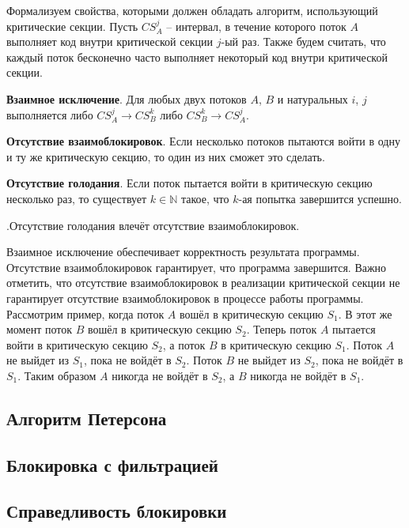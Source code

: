 Формализуем свойства, которыми должен обладать алгоритм, использующий
критические секции. Пусть $CS^j_A$ -- интервал, в течение которого поток $A$
выполняет код внутри критической секции $j$-ый раз. Также будем считать, что
каждый поток бесконечно часто выполняет некоторый код внутри критической секции.

\textbf{Взаимное исключение}. Для любых двух потоков $A$, $B$ и натуральных $i$,
$j$ выполняется либо $CS^j_A \rightarrow CS^k_B$ либо
$CS^k_B \rightarrow CS^j_A$.

\textbf{Отсутствие взаимоблокировок}. Если несколько потоков пытаются войти в
одну и ту же критическую секцию, то один из них сможет это сделать.

\textbf{Отсутствие голодания}. Если поток пытается войти в критическую секцию
несколько раз, то существует $k \in \mathbb{N}$ такое, что $k$-ая попытка
завершится успешно.

\begin{note}.Отсутствие голодания влечёт отсутствие взаимоблокировок.
\end{note}

Взаимное исключение обеспечивает корректность результата программы. Отсутствие
взаимоблокировок гарантирует, что программа завершится. Важно отметить, что
отсутствие взаимоблокировок в реализации критической секции не гарантирует
отсутствие взаимоблокировок в процессе работы программы. Рассмотрим пример,
когда поток $A$ вошёл в критическую секцию $S_1$. В этот же момент поток $B$
вошёл в критическую секцию $S_2$. Теперь поток $A$ пытается войти в критическую
секцию $S_2$, а поток $B$ в критическую секцию $S_1$. Поток $A$ не выйдет из
$S_1$, пока не войдёт в $S_2$. Поток $B$ не выйдет из $S_2$, пока не войдёт в
$S_1$. Таким образом $A$ никогда не войдёт в $S_2$, а $B$ никогда не войдёт в
$S_1$.

\subsection{Алгоритм Петерсона}

\subsection{Блокировка с фильтрацией}

\subsection{Справедливость блокировки}

